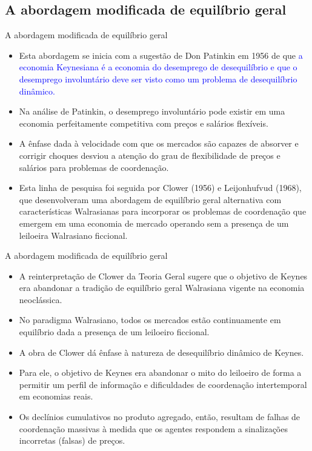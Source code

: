 \documentclass[10pt]{beamer}
\begin{document}
\subsection{A abordagem modificada de equilíbrio geral}
\begin{frame}{A abordagem modificada de equilíbrio geral}
    \begin{itemize}
        \item Esta abordagem se inicia com a sugestão de Don Patinkin em 1956 de que \textcolor{blue}{a economia Keynesiana é a economia do desemprego de desequilíbrio e que o desemprego involuntário deve ser visto como um problema de desequilíbrio dinâmico.}
        \bigskip
        \item Na análise de Patinkin, o desemprego involuntário pode existir em uma economia perfeitamente competitiva com preços e salários flexíveis.
        \bigskip
        \item A ênfase dada à velocidade com que os mercados são capazes de absorver e corrigir choques desviou a atenção do grau de flexibilidade de preços e salários para problemas de coordenação.
        \bigskip
        \item Esta linha de pesquisa foi seguida por Clower (1956) e Leijonhufvud (1968), que desenvolveram uma abordagem de equilíbrio geral alternativa com características Walrasianas para incorporar os problemas de coordenação que emergem em uma economia de mercado operando sem a presença de um leiloeira Walrasiano ficcional.
    \end{itemize}
\end{frame}

\begin{frame}{A abordagem modificada de equilíbrio geral}
    \begin{itemize}
        \item A reinterpretação de Clower da Teoria Geral sugere que o objetivo de Keynes era abandonar a tradição de equilíbrio geral Walrasiana vigente na economia neoclássica.
        \bigskip
        \item No paradigma Walrasiano, todos os mercados estão continuamente em equilíbrio dada a presença de um leiloeiro ficcional.
        \bigskip
        \item A obra de Clower dá ênfase à natureza de desequilíbrio dinâmico de Keynes.
        \bigskip
        \item Para ele, o objetivo de Keynes era abandonar o mito do leiloeiro de forma a permitir um perfil de informação e dificuldades de coordenação intertemporal em economias reais.
        \bigskip
        \item Os declínios cumulativos no produto agregado, então, resultam de falhas de coordenação massivas à medida que os agentes respondem a sinalizações incorretas (falsas) de preços.
    \end{itemize}
\end{frame}
\end{document}
